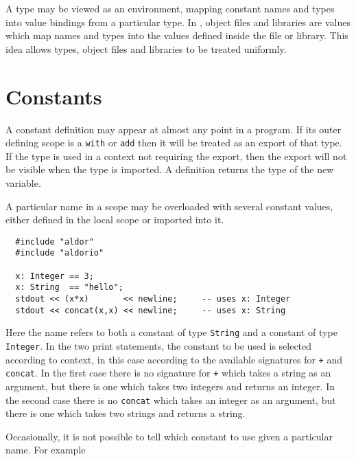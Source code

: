 A type may be viewed as an environment, mapping constant names and
types into value bindings from a particular type. In \asharp{},
object files and libraries are values which map names and types
into the values defined inside the file or library. This idea allows
types, object files and libraries to be treated uniformly.

\section{Constants}

A constant definition may appear at almost any point in a
program. If its outer defining scope is a {\tt with} or {\tt add}
then it will be treated as an export of that type. If the type is
used in a context not requiring the export, then the export will not be
visible when the type is imported. A definition returns the type of
the new variable.

A particular name in a scope may be overloaded with several
constant values, either defined in the local scope or imported into it.

\begin{small}
\begin{verbatim}
  #include "aldor"
  #include "aldorio"

  x: Integer == 3;
  x: String  == "hello";
  stdout << (x*x)       << newline;     -- uses x: Integer
  stdout << concat(x,x) << newline;     -- uses x: String
\end{verbatim}
\end{small}

Here the name  refers to both a constant of type {\tt String}
and a constant of type {\tt Integer}. In the two print statements, the
constant to be used is selected according to context, in this case according
to the available signatures for {\tt +} and {\tt concat}.  In the first
case there is no signature for {\tt +} which takes a string as an argument,
but there is one which takes two integers and returns an integer.  In the
second case there is no {\tt concat} which takes an integer as an argument,
but there is one which takes two strings and returns a string.


Occasionally, it is not possible to tell which constant to use given
a particular name. For example


